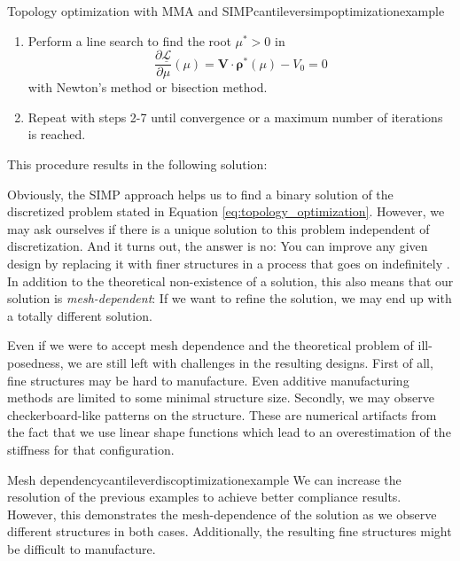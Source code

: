 \begin{example}{Topology optimization with MMA and SIMP}{cantileversimpoptimizationexample}
\begin{enumerate}
\begin{align}
            \end{align}
        \item Perform a line search to find the root $\mu^*>0$ in 
        \begin{equation}
            \frac{\partial \underline{\mathcal{L}}}{\partial \mu}(\mu) = \mathbf{V} \cdot \pmb{\rho}^* (\mu) - V_0  = 0
        \end{equation}
        with Newton's method or bisection method. 
        \item Repeat with steps 2-7 until convergence or a maximum number of iterations is reached.
    \end{enumerate}

    This procedure results in the following solution:
    \begin{center}
        
    \end{center}
\end{example}

Obviously, the SIMP approach helps us to find a binary solution of the discretized problem stated in Equation \eqref{eq:topology_optimization}. However, we may ask ourselves if there is a unique solution to this problem independent of discretization. And it turns out, the answer is no: You can improve any given design by replacing it with finer structures in a process that goes on indefinitely \cite{Christensen2008}. 
In addition to the theoretical non-existence of a solution, this also means that our solution is \emph{mesh-dependent}: If we want to refine the solution, we may end up with a totally different solution. 

Even if we were to accept mesh dependence and the theoretical problem of ill-posedness, we are still left with challenges in the resulting designs. First of all, fine structures may be hard to manufacture. Even additive manufacturing methods are limited to some minimal structure size. Secondly, we may observe checkerboard-like patterns on the structure. These are numerical artifacts from the fact that we use linear shape functions which lead to an overestimation of the stiffness for that configuration.

\begin{example}{Mesh dependency}{cantileverdiscoptimizationexample}
    We can increase the resolution of the previous examples to achieve better compliance results. However, this demonstrates the mesh-dependence of the solution as we observe different structures in both cases. Additionally, the resulting fine structures might be difficult to manufacture.
    \begin{center}
        
        
    \end{center}
\end{example}

